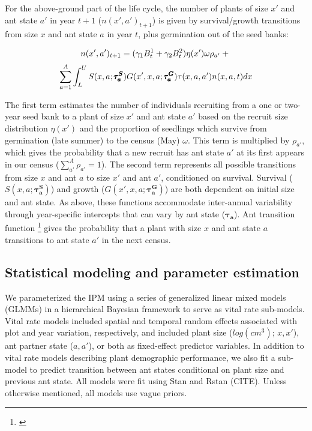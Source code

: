 \documentclass[11pt]{article}
\newcommand{\tom}[2]{{\color{red}{#1}}\footnote{\textit{\color{red}{#2}}}}
\begin{document}
For the above-ground part of the life cycle, the number of plants of size $x'$ and ant state $a'$ in year $t+1$ ($n(x',a')_{t+1}$) is given by survival/growth transitions from size $x$ and ant state $a$ in year $t$, plus germination out of the seed banks:
\begin{linenomath*}
	$$
	n(x',a')_{t+1} = (\gamma_1 B^1_{t} + \gamma_2 B^2_{t} ) \eta(x') \omega \rho_{a'}  + \\
	$$
	$$
	\sum_{a=1}^{A} \int_L^U S(x,a;\pmb{\tau^S_{a}}) G(x',x,a;\pmb{\tau^G_{a}}) \tau(x,a,a') n(x,a,t) dx \\
	$$
\end{linenomath*}

The first term estimates the number of individuals recruiting from a one or two-year seed bank to a plant of size $x'$ and ant state $a'$ based on the recruit size distribution $\eta(x')$ and the proportion of seedlings which survive from germination (late summer) to the census (May) $\omega$.
This term is multiplied by $\rho_{a'}$, which gives the probability that a new recruit has ant state $a'$ at its first appears in our census ($\sum_{a'}^{A}\rho_{a'}=1$). 
The second term represents all possible transitions from size $x$ and ant $a$ to size $x'$ and ant $a'$, conditioned on survival. 
Survival ($S(x,a;\pmb{\tau^S_{a}})$) and growth ($G(x',x,a;\pmb{\tau^G_{a}})$) are both dependent on initial size and ant state. 
As above, these functions accommodate inter-annual variability through year-specific intercepts that can vary by ant state ($\pmb{\tau_{a}}$). 
Ant transition function \tom{$\tau(a',a,x)$}{Are there random intercepts in the ant transition function, and are they ant-specific?} gives the probability that a plant with size $x$ and ant state $a$ transitions to ant state $a'$ in the next census. 

\subsection*{Statistical modeling and parameter estimation}
We parameterized the IPM using a series of generalized linear mixed models (GLMMs) in a hierarchical Bayesian framework to serve as vital rate sub-models. 
Vital rate models included spatial and temporal random effects associated with plot and year variation, respectively, and included plant size ($log(cm^3)$; $x,x'$), ant partner state ($a,a'$), or both as fixed-effect predictor variables. 
In addition to vital rate models describing plant demographic performance, we also fit a sub-model to predict transition between ant states conditional on plant size and previous ant state. 
All models were fit using Stan and Rstan (CITE). 
Unless otherwise mentioned, all models use vague priors. 
\end{document}
